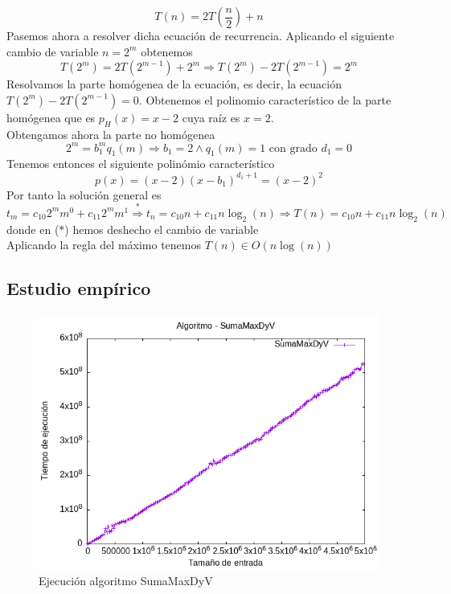 \documentclass[11pt,openany]{book}
\begin{document}
\begin{equation*}
      T(n)=2T(\frac{n}{2})+n
\end{equation*}
  Pasemos ahora a resolver dicha ecuación de recurrencia. Aplicando el siguiente cambio de variable $n=2^m$ obtenemos
\begin{equation*}
      T(2^m)=2T(2^{m-1})+2^m \Longrightarrow T(2^m)-2T(2^{m-1})=2^m
\end{equation*}
  Resolvamos la parte homógenea de la ecuación, es decir, la ecuación $T(2^m)-2T(2^{m-1})=0$. Obtenemos el polinomio
  característico de la parte homógenea que es $p_H(x)=x-2$ cuya raíz es $x=2$. \\
  Obtengamos ahora la parte no homógenea
\begin{equation*}
      2^m=b_1^m q_1(m) \Longrightarrow b_1=2 \wedge q_1(m)=1 \text{ con grado } d_1=0
\end{equation*}
  Tenemos entonces el siguiente polinómio característico
\begin{equation*}
      p(x)=(x-2)(x-b_1)^{d_1+1}=(x-2)^2
\end{equation*}
  Por tanto la solución general es
\begin{equation*}
      t_m=c_{10}2^mm^0+c_{11}2^mm^1  \overset{*}{\Longrightarrow}  t_n=c_{10}n+c_{11}n\log_2(n) \Longrightarrow T(n)=c_{10}n+c_{11}n\log_2(n)
\end{equation*}
  donde en ($*$) hemos deshecho el cambio de variable \\
  Aplicando la regla del máximo tenemos $T(n) \in O(n\log(n))$

\subsection{Estudio empírico}
\begin{center}
      \begin{figure}[h]
            \centering
            \includegraphics[width=0.7\linewidth]{assets/Img/SumaMaxDyV.png}
            \caption{Ejecución algoritmo SumaMaxDyV}
            \label{fig:SumaMaxDyV}
      \end{figure}
\end{center}
\newpage
\end{document}
